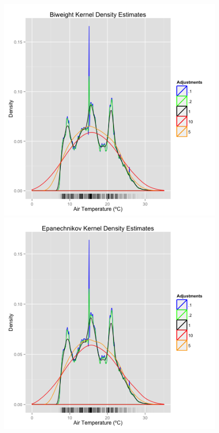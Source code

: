 \documentclass[english]{article}\usepackage{graphicx, color}
\numberwithin{equation}{section}
\numberwithin{figure}{section}
\begin{document}
\begin{figure}
\begin{center}
\includegraphics[scale = .4]{Temperature_Density_Biweight_Kernel.png}
\includegraphics[scale = .4]{Temperature_Density_Epanechnikov_Kernel.png}
\end{center}


\end{figure}
\end{document}
